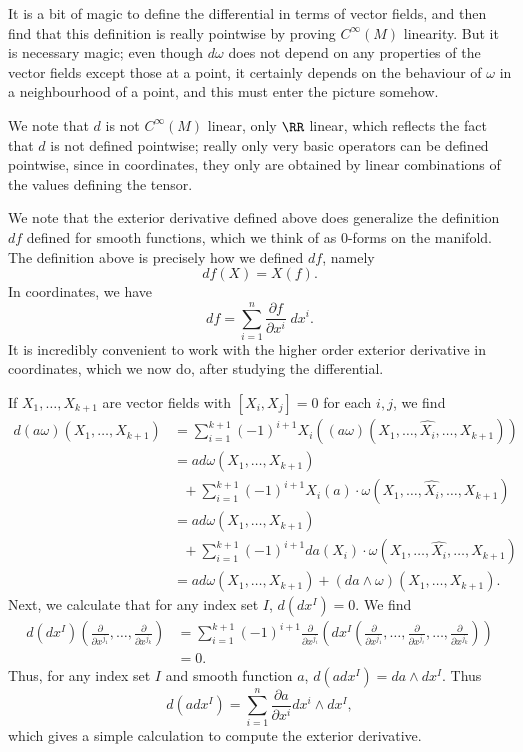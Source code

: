 It is a bit of magic to define the differential in terms of vector fields, and then find that this definition is really pointwise by proving $C^\infty(M)$ linearity. But it is necessary magic; even though $d\omega$ does not depend on any properties of the vector fields except those at a point, it certainly depends on the behaviour of $\omega$ in a neighbourhood of a point, and this must enter the picture somehow.

\begin{remark}
    We note that $d$ is not $C^\infty(M)$ linear, only $\RR$ linear, which reflects the fact that $d$ is not defined pointwise; really only very basic operators can be defined pointwise, since in coordinates, they only are obtained by linear combinations of the values defining the tensor.
\end{remark}

We note that the exterior derivative defined above does generalize the definition $df$ defined for smooth functions, which we think of as 0-forms on the manifold. The definition above is precisely how we defined $df$, namely
%
\[ df(X) = X(f). \]
%
In coordinates, we have
%
\[ df = \sum_{i = 1}^n \frac{\partial f}{\partial x^i}\; dx^i. \]
%
It is incredibly convenient to work with the higher order exterior derivative in coordinates, which we now do, after studying the differential.

If $X_1, \dots, X_{k+1}$ are vector fields with $[X_i,X_j] = 0$ for each $i,j$, we find
%
\begin{align*}
    d(a \omega)(X_1, \dots, X_{k+1}) &= \sum_{i = 1}^{k+1} (-1)^{i+1} X_i \left( (a \omega)(X_1, \dots, \widehat{X_i}, \dots, X_{k+1}) \right)\\
    &= a d\omega(X_1, \dots, X_{k+1})\\
    &\ \ \ + \sum_{i = 1}^{k+1} (-1)^{i+1} X_i(a) \cdot \omega(X_1, \dots, \widehat{X_i}, \dots, X_{k+1})\\
    &= a d\omega(X_1, \dots, X_{k+1})\\
    &\ \ \ + \sum_{i = 1}^{k+1} (-1)^{i+1} da(X_i) \cdot \omega(X_1, \dots, \widehat{X_i}, \dots, X_{k+1})\\
    &= a d\omega(X_1, \dots, X_{k+1}) + (da \wedge \omega)(X_1, \dots, X_{k+1}).
\end{align*}
%
Next, we calculate that for any index set $I$, $d(dx^I) = 0$. We find
%
\begin{align*}
    d(dx^I)\left( \frac{\partial}{\partial x^{j_1}}, \dots, \frac{\partial}{\partial x^{j_k}} \right) &= \sum_{i = 1}^{k+1} (-1)^{i+1} \frac{\partial}{\partial x^{j_i}} \left( dx^I \left( \frac{\partial}{\partial x^{j_1}}, \dots, \frac{\partial}{\partial x^{j_i}} , \dots, \frac{\partial}{\partial x^{j_k}} \right) \right)\\
    &= 0.
\end{align*}
%
Thus, for any index set $I$ and smooth function $a$, $d(a dx^I) = da \wedge dx^I$. Thus
%
\[ d(a dx^I) = \sum_{i = 1}^n \frac{\partial a}{\partial x^i} dx^i \wedge dx^I, \]
%
which gives a simple calculation to compute the exterior derivative.

